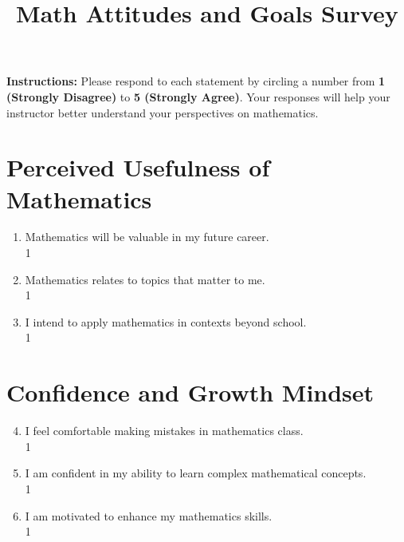 \documentclass[12pt]{article}
\title{\textbf{Math Attitudes and Goals Survey}}
\author{}
\date{}
\begin{document}
\maketitle

\begin{center}
    \textnormal{\textbf{Instructions:} Please respond to each statement by circling a number from \textbf{1 (Strongly Disagree)} to \textbf{5 (Strongly Agree)}. Your responses will help your instructor better understand your perspectives on mathematics.}
\end{center}

\vspace{1em}

\section*{Perceived Usefulness of Mathematics}

\begin{enumerate}[label=\arabic*., leftmargin=1.5em]
    \item Mathematics will be valuable in my future career. \\
          \hfill 1    
    \item Mathematics relates to topics that matter to me. \\
          \hfill 1    
    \item I intend to apply mathematics in contexts beyond school. \\
          \hfill 1    
\end{enumerate}

\vspace{1em}

\section*{Confidence and Growth Mindset}

\begin{enumerate}[label=\arabic*., leftmargin=1.5em]
    \setcounter{enumi}{3}
    \item I feel comfortable making mistakes in mathematics class. \\
          \hfill 1    
    \item I am confident in my ability to learn complex mathematical concepts. \\
          \hfill 1    
    \item I am motivated to enhance my mathematics skills. \\
          \hfill 1    
\end{enumerate}
\end{document}
